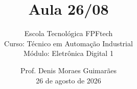 
\title{Aula 26/08}

\subtitle{
\vspace{1.0cm}
Escola Tecnológica FPFtech\\
\vspace{0.5cm}
Curso: Técnico em Automação Industrial\\
\vspace{0.5cm}
Módulo: Eletrônica Digital 1
\vspace{1.0cm}
}

\author{
Prof. Denis Moraes Guimarães\\
\small 26 de agosto de 2026
}

\date{}